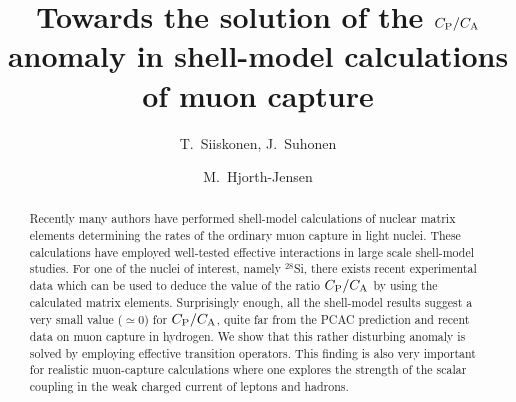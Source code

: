 
\draft



\title{Towards the solution of the $C_{\rm P}/C_{\rm A}$ anomaly in
shell-model calculations of muon capture}

\author{T.\ Siiskonen, J.\ Suhonen}

\address{Department of Physics, University of Jyv\"{a}skyl\"{a},
     P.O.Box 35, FIN-40351 Jyv\"{a}skyl\"{a}, Finland}

\author{M.\ Hjorth-Jensen}

\address{Nordita, Blegdamsvej 17, DK-2100 Copenhagen \O, Denmark}

\maketitle

\begin{abstract}
Recently many authors have performed shell-model calculations of
nuclear matrix elements
determining the rates of the ordinary muon
capture in light nuclei.
These calculations have employed well-tested
effective interactions
in large scale shell-model studies.
For one of the nuclei of interest, namely
$^{28}$Si, there exists recent experimental data which can be used to
deduce the value of the ratio $C_{\rm P}/C_{\rm A}$ by using the calculated
matrix elements. Surprisingly enough, all the shell-model results
suggest a very small value ($\simeq 0$) for $C_{\rm P}/C_{\rm A}$, quite
far from the PCAC prediction and recent data on muon capture in
hydrogen. We show that this rather
disturbing anomaly is solved by employing
effective transition operators. This finding
is also very important for realistic muon-capture calculations
where one explores the strength of the scalar coupling in the weak
charged current of leptons and hadrons.
\end{abstract}


